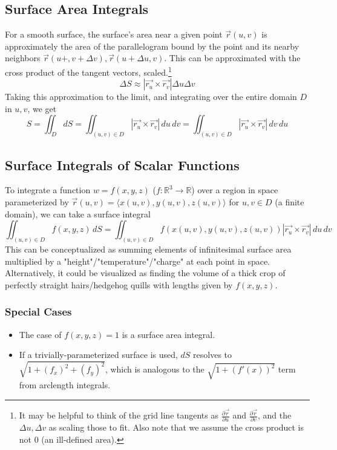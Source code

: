 \documentclass{article}
\newcommand{\vect}[1]{\ensuremath{\overrightarrow{#1}}}
\begin{document}
\subsection{Surface Area Integrals}
For a smooth surface, the surface's area near a given point $\vect{r}(u,v)$ is approximately the area of the parallelogram bound by the point and its nearby neighbors $\vect{r}(u+,v+\Delta v), \vect{r}(u+\Delta u, v)$. This can be approximated with the cross product of the tangent vectors, scaled.\footnote{It may be helpful to think of the grid line tangents as $\frac{\partial \vect{r}}{\partial u}$ and $\frac{\partial \vect{r}}{\partial v}$, and the $\Delta u,\Delta v$ as scaling those to fit. Also note that we assume the cross product is not $0$ (an ill-defined area).}
$$\Delta S \approx \left|\vect{r_u}\times\vect{r_v}\right|\Delta u\Delta v$$
Taking this approximation to the limit, and integrating over the entire domain $D$ in $u,v$, we get
$$S = \iint_DdS=\iint_{(u,v)\in D}\left|\vect{r_u}\times\vect{r_v}\right|\,du\,dv=\iint_{(u,v)\in D}\left|\vect{r_u}\times\vect{r_v}\right|\,dv\,du$$

\subsection{Surface Integrals of Scalar Functions}
To integrate a function $w=f(x,y,z)$ ($f:\mathbb{R}^3\to\mathbb{R}$) over a region in space parameterized by $\vect{r}(u,v)=\langle x(u,v), y(u,v), z(u,v) \rangle$ for $u,v \in D$ (a finite domain), we can take a surface integral
$$\iint_{(u,v)\in D} f(x,y,z)\,dS=\iint_{(u,v)\in D}f(x(u,v),y(u,v),z(u,v))\left|\vect{r_u}\times\vect{r_v}\right|\,du\,dv$$
This can be conceptualized as summing elements of infinitesimal surface area multiplied by a "height"/"temperature"/"charge" at each point in space. Alternatively, it could be visualized as finding the volume of a thick crop of perfectly straight hairs/hedgehog quills with lengths given by $f(x,y,z)$.

\subsubsection{Special Cases}
\begin{itemize}
    \item The case of $f(x,y,z)=1$ is a surface area integral.
    \item If a trivially-parameterized surface is used, $dS$ resolves to $\sqrt{1+\left(f_x\right)^2+\left(f_y\right)^2}$, which is analogous to the $\sqrt{1+(f'(x))^2}$ term from arclength integrals.
\end{itemize}
\end{document}
